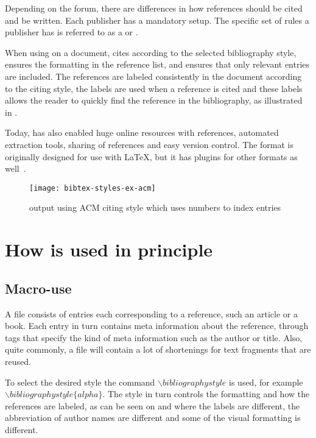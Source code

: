 Depending on the forum, there are differences in how references should
be cited and be written.  Each publisher has a mandatory setup.  The
specific set of rules a publisher has is referred to as a
 or .

When using {\bibtex} on a document, {\bibtex} cites according to the
selected bibliography style, ensures the formatting in the reference
list, and ensures that only relevant entries are included.  The
references are labeled consistently in the document according to the
citing style, the labels are used when a reference is cited and these
labels allows the reader to quickly find the reference in the
bibliography, as illustrated in .

Today, {\bibtex} has also enabled huge online resources with
references, automated extraction tools, sharing of references and easy
version control.  The {\bibtex} format is originally designed for use
with {\LaTeX}, but it has plugins for other formats as
well~\cite{bibtex_resource}.

\begin{figure}
  \centering
  \texttt{[image: bibtex-styles-ex-acm]}
  \caption{{\bibtex} output using ACM citing style which uses numbers to
    index entries}
\label{fig:bibtex_example_acm}
\end{figure}

\section{How {\bibtex} is used in principle}
\label{sec:practice_of_bibtex}

\subsection{Macro-use}

A {\bibtex} file consists of entries each corresponding to a
reference, such an article or a book.  Each entry in turn contains
meta information about the reference, through tags that specify the
kind of meta information such as the author or title.  Also, quite
commonly, a file will contain a lot of shortenings for text fragments
that are reused.

To select the desired style the command
${\backslash}bibliographystyle$ is used, for example
${\backslash}bibliographystyle\{alpha\}$.  The style in turn controls
the formatting and how the references are labeled, as can be seen on
 and 
where the labels are different, the abbreviation of author names are
different and some of the visual formatting is different.

